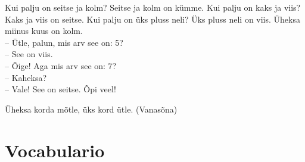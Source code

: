 Kui palju on seitse ja kolm? Seitse ja kolm on kümme. Kui palju on kaks ja viis? Kaks ja viis on seitse. Kui palju on üks pluss neli? Üks pluss neli on viis. Üheksa miinus kuus on kolm. \\

-- Ütle, palun, mis arv see on: 5? \\
-- See on viis. \\
-- Õige! Aga mis arv see on: 7? \\
-- Kaheksa? \\ 
-- Vale! See on seitse. Õpi veel! \\

\begin{center}
Üheksa korda mõtle, üks kord ütle. (Vanasõna)
\end{center}

\Large{\section*{Vocabulario}}

